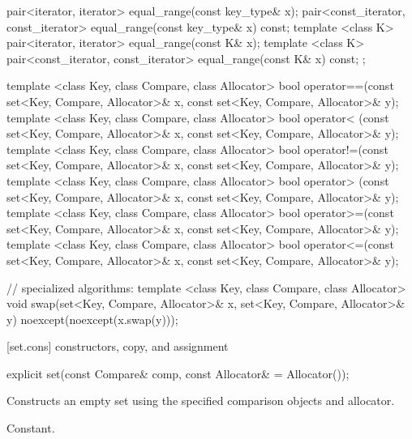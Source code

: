 \begin{codeblock}
{{    pair<iterator, iterator>               equal_range(const key_type& x);
    pair<const_iterator, const_iterator>   equal_range(const key_type& x) const;
    template <class K>
      pair<iterator, iterator>             equal_range(const K& x);
    template <class K>
      pair<const_iterator, const_iterator> equal_range(const K& x) const;
  };

  template <class Key, class Compare, class Allocator>
    bool operator==(const set<Key, Compare, Allocator>& x,
                    const set<Key, Compare, Allocator>& y);
  template <class Key, class Compare, class Allocator>
    bool operator< (const set<Key, Compare, Allocator>& x,
                    const set<Key, Compare, Allocator>& y);
  template <class Key, class Compare, class Allocator>
    bool operator!=(const set<Key, Compare, Allocator>& x,
                    const set<Key, Compare, Allocator>& y);
  template <class Key, class Compare, class Allocator>
    bool operator> (const set<Key, Compare, Allocator>& x,
                    const set<Key, Compare, Allocator>& y);
  template <class Key, class Compare, class Allocator>
    bool operator>=(const set<Key, Compare, Allocator>& x,
                    const set<Key, Compare, Allocator>& y);
  template <class Key, class Compare, class Allocator>
    bool operator<=(const set<Key, Compare, Allocator>& x,
                    const set<Key, Compare, Allocator>& y);

  // specialized algorithms:
  template <class Key, class Compare, class Allocator>
    void swap(set<Key, Compare, Allocator>& x,
              set<Key, Compare, Allocator>& y)
      noexcept(noexcept(x.swap(y)));
}
\end{codeblock}%
%

[set.cons]{ constructors, copy, and assignment}

%
%
\begin{itemdecl}
explicit set(const Compare& comp, const Allocator& = Allocator());
\end{itemdecl}

\begin{itemdescr}
\pnum
\effects
Constructs an empty set using the specified comparison objects and allocator.

\pnum
\complexity
Constant.
\end{itemdescr}


